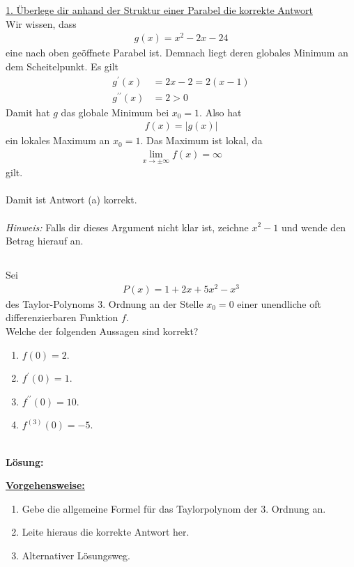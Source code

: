 \underline{1. Überlege dir anhand der Struktur einer Parabel die korrekte Antwort}\\
Wir wissen, dass 
\begin{align*}
g(x) = x^2 -2x -24
\end{align*}
eine nach oben geöffnete Parabel ist.
Demnach liegt deren globales Minimum an dem Scheitelpunkt.
Es gilt 
\begin{align*}
g^\prime(x) &= 2x -2 = 2 (x-1)\\
g^{\prime \prime}(x) &= 2  >0
\end{align*}
Damit hat $ g $ das globale Minimum bei $ x_0 = 1 $. 
Also hat
\begin{align*}
f(x) = |g(x) | 
\end{align*}
ein lokales Maximum an $ x_0 = 1 $. Das Maximum ist lokal, da
\begin{align*}
\lim \limits_{x \to \pm \infty} f(x) = \infty
\end{align*}
gilt.\\
\\
Damit ist Antwort (a) korrekt.\\
\\
\textit{Hinweis:} Falls dir dieses Argument nicht klar ist, zeichne $ x^2 -1 $ und wende den Betrag hierauf an.
\newpage

\subsection*{}
Sei 
\begin{align*}
P(x) = 1 + 2x + 5x^2 -x^3
\end{align*}
des Taylor-Polynoms 3. Ordnung an der Stelle $ x_0 = 0 $ einer unendliche oft differenzierbaren Funktion $ f $.\\
Welche der folgenden Aussagen sind korrekt?
\renewcommand{\labelenumi}{(\alph{enumi})}
\begin{enumerate}
	\item 
	$ f(0) = 2 $.
	\item
	$ f^\prime(0) = 1 $.
	\item
	$ f^{\prime \prime}(0) = 10 $.
	\item
	$ f^{(3)}(0) = -5 $.
\end{enumerate}
\ \\
\textbf{Lösung:}
\begin{mdframed}
	\underline{\textbf{Vorgehensweise:}}
	\renewcommand{\labelenumi}{\theenumi.}
	\begin{enumerate}
		\item Gebe die allgemeine Formel für das Taylorpolynom der 3. Ordnung an.
		\item Leite hieraus die korrekte Antwort her.
		\item Alternativer Lösungsweg.	
\end{enumerate}
\end{mdframed}


